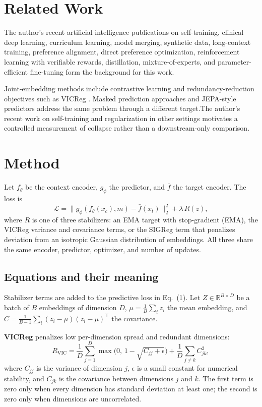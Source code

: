 \documentclass[conference]{IEEEtran}
\begin{document}
\section{Related Work}
The author's recent artificial intelligence publications on self-training, clinical deep learning, curriculum learning, model merging, synthetic data, long-context training, preference alignment, direct preference optimization, reinforcement learning with verifiable rewards, distillation, mixture-of-experts, and parameter-efficient fine-tuning \cite{d1selftraining,d2glaucoma,d3curriculum,d4merging,d5synthetic,d6longcontext,d7rlaif,d8distillation,d9moe,d10peft,d11dpo,d12rlvr} form the background for this work.

Joint-embedding methods include contrastive learning and redundancy-reduction objectives such as VICReg \cite{bardes2022vicreg}. Masked prediction approaches and JEPA-style predictors \cite{bardes2024vjepa} address the same problem through a different target.The author's recent work on self-training and regularization in other settings \cite{d1selftraining,d3curriculum,d5synthetic} motivates a controlled measurement of collapse rather than a downstream-only comparison.

\section{Method}
Let $f_\theta$ be the context encoder, $g_\phi$ the predictor, and $\bar{f}$ the target encoder. The loss is
\begin{equation}
\mathcal{L} = \lVert g_\phi(f_\theta(x_c), m) - \bar{f}(x_t) \rVert_2^2 + \lambda\, R(z),
\end{equation}
where $R$ is one of three stabilizers: an EMA target with stop-gradient (EMA), the VICReg variance and covariance terms, or the SIGReg term that penalizes deviation from an isotropic Gaussian distribution of embeddings. All three share the same encoder, predictor, optimizer, and number of updates.

\subsection*{Equations and their meaning}
Stabilizer terms are added to the predictive loss in Eq.~(1). Let $Z\in\mathbb{R}^{B\times D}$ be a batch of $B$ embeddings of dimension $D$, $\mu=\frac{1}{B}\sum_i z_i$ the mean embedding, and $C=\frac{1}{B-1}\sum_i (z_i-\mu)(z_i-\mu)^\top$ the covariance.

\textbf{VICReg} penalizes low per-dimension spread and redundant dimensions:
\begin{equation}
R_{\mathrm{VIC}}=\frac{1}{D}\sum_{j=1}^{D}\max\!\big(0,\,1-\sqrt{C_{jj}+\epsilon}\big)+\frac{1}{D}\sum_{j\neq k}C_{jk}^{2},
\end{equation}
where $C_{jj}$ is the variance of dimension $j$, $\epsilon$ is a small constant for numerical stability, and $C_{jk}$ is the covariance between dimensions $j$ and $k$. The first term is zero only when every dimension has standard deviation at least one; the second is zero only when dimensions are uncorrelated.
\end{document}

